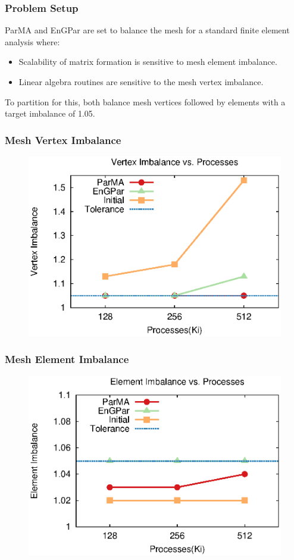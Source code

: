 \documentclass{beamer}
\begin{document}
\begin{frame}
  \frametitle{Problem Setup}
  ParMA and EnGPar are set to balance the mesh for a standard finite element analysis where:
  \begin{itemize}
  \item Scalability of matrix formation is sensitive to mesh element imbalance.
  \item Linear algebra routines are sensitive to the mesh vertex imbalance.
  \end{itemize}
  \bigskip
  To partition for this, both balance mesh vertices followed by elements with a target imbalance of 1.05. \\
  
\end{frame}

\begin{frame}
  \frametitle{Mesh Vertex Imbalance}
  \begin{figure}
    \centering
    \includegraphics[width=.8\textwidth]{figures/vimb_v_cores.eps}
  \end{figure}  
\end{frame}

\begin{frame}
  \frametitle{Mesh Element Imbalance}
  \begin{figure}
    \centering
    \includegraphics[width=.8\textwidth]{figures/eimb_v_cores.eps}
  \end{figure}  
\end{frame}
\end{document}
